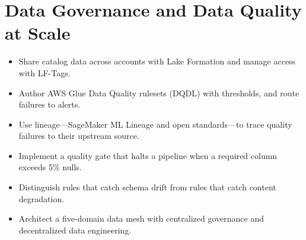 \chapter{Data Governance and Data Quality at Scale}
%
\begin{objectives}
\begin{itemize}
    \item Share catalog data across accounts with Lake Formation and manage access with LF-Tags.
    \item Author AWS Glue Data Quality rulesets (DQDL) with thresholds, and route failures to alerts.
    \item Use lineage---SageMaker ML Lineage and open standards---to trace quality failures to their upstream source.
    \item Implement a quality gate that halts a pipeline when a required column exceeds 5\% nulls.
    \item Distinguish rules that catch schema drift from rules that catch content degradation.
    \item Architect a five-domain data mesh with centralized governance and decentralized data engineering.
\end{itemize}
\end{objectives}

